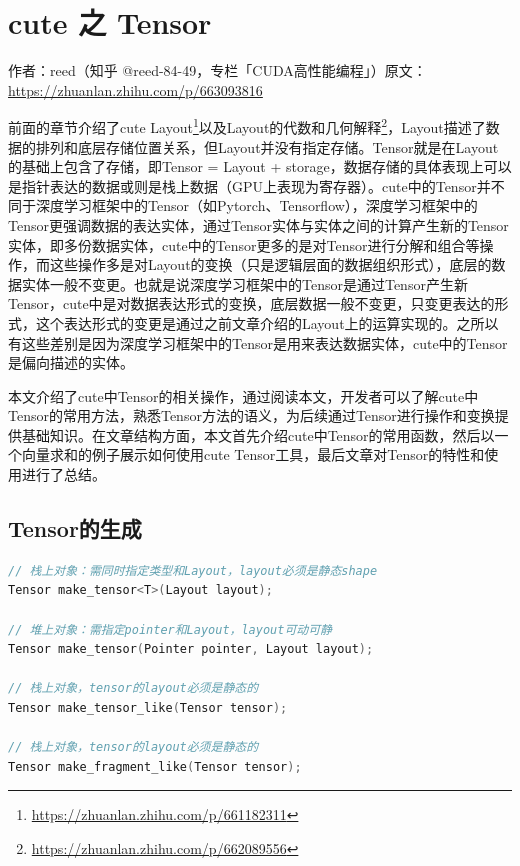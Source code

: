 \chapter{cute 之 Tensor}

\begin{center}\small 作者：reed（知乎 @reed-84-49，专栏「CUDA高性能编程」）\quad 原文：\url{https://zhuanlan.zhihu.com/p/663093816}\end{center}

前面的章节介绍了cute Layout\footnote{\url{https://zhuanlan.zhihu.com/p/661182311}}以及Layout的代数和几何解释\footnote{\url{https://zhuanlan.zhihu.com/p/662089556}}，Layout描述了数据的排列和底层存储位置关系，但Layout并没有指定存储。Tensor就是在Layout的基础上包含了存储，即Tensor = Layout + storage，数据存储的具体表现上可以是指针表达的数据或则是栈上数据（GPU上表现为寄存器）。cute中的Tensor并不同于深度学习框架中的Tensor（如Pytorch、Tensorflow），深度学习框架中的Tensor更强调数据的表达实体，通过Tensor实体与实体之间的计算产生新的Tensor实体，即多份数据实体，cute中的Tensor更多的是对Tensor进行分解和组合等操作，而这些操作多是对Layout的变换（只是逻辑层面的数据组织形式），底层的数据实体一般不变更。也就是说深度学习框架中的Tensor是通过Tensor产生新Tensor，cute中是对数据表达形式的变换，底层数据一般不变更，只变更表达的形式，这个表达形式的变更是通过之前文章介绍的Layout上的运算实现的。之所以有这些差别是因为深度学习框架中的Tensor是用来表达数据实体，cute中的Tensor是偏向描述的实体。

本文介绍了cute中Tensor的相关操作，通过阅读本文，开发者可以了解cute中Tensor的常用方法，熟悉Tensor方法的语义，为后续通过Tensor进行操作和变换提供基础知识。在文章结构方面，本文首先介绍cute中Tensor的常用函数，然后以一个向量求和的例子展示如何使用cute Tensor工具，最后文章对Tensor的特性和使用进行了总结。

\section{Tensor的生成}

\begin{lstlisting}[language=C++]
// 栈上对象：需同时指定类型和Layout，layout必须是静态shape
Tensor make_tensor<T>(Layout layout);

// 堆上对象：需指定pointer和Layout，layout可动可静
Tensor make_tensor(Pointer pointer, Layout layout);

// 栈上对象，tensor的layout必须是静态的
Tensor make_tensor_like(Tensor tensor);

// 栈上对象，tensor的layout必须是静态的
Tensor make_fragment_like(Tensor tensor);
\end{lstlisting}

